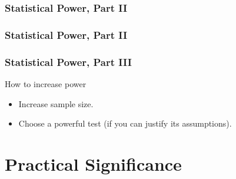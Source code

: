\documentclass[12pt, block=fill]{beamer}
\begin{document}
\begin{frame}
  \frametitle{Statistical Power, Part II}

\begin{center}
  \centering
\end{center}
\end{frame}

\begin{frame}
  \frametitle{Statistical Power, Part II}
  
\end{frame} 

\begin{frame}
\frametitle{Statistical Power, Part III}

How to increase power
\begin{itemize}
\item Increase sample size.
\item Choose a powerful test (if you can justify its assumptions).
\end{itemize}

\end{frame}

\section{Practical Significance}
\end{document}
